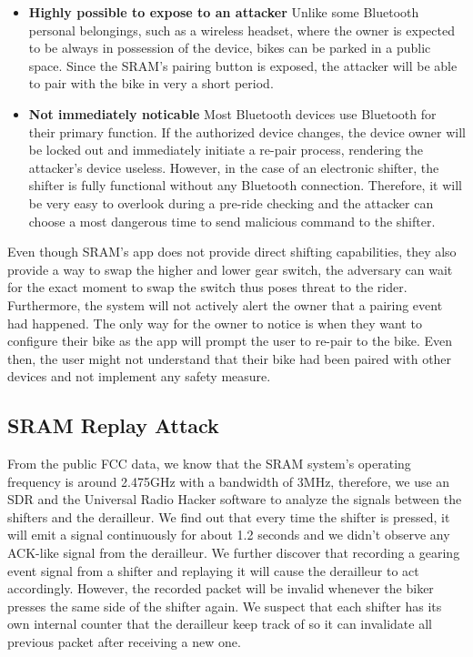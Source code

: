 \documentclass[letterpaper,twocolumn,10pt]{article}
\begin{document}
\begin{itemize}
  \item \textbf{Highly possible to expose to an attacker} Unlike some Bluetooth personal belongings, such as a wireless headset, where the owner is expected to be always in possession of the device, bikes can be parked in a public space. Since the SRAM's pairing button is exposed, the attacker will be able to pair with the bike in very a short period.
  \item \textbf{Not immediately noticable} Most Bluetooth devices use Bluetooth for their primary function. If the authorized device changes, the device owner will be locked out and immediately initiate a re-pair process, rendering the attacker’s device useless. However, in the case of an electronic shifter, the shifter is fully functional without any Bluetooth connection. Therefore, it will be very easy to overlook during a pre-ride checking and the attacker can choose a most dangerous time to send malicious command to the shifter.
\end{itemize}

Even though SRAM's app does not provide direct shifting capabilities, they also provide a way to swap the higher and lower gear switch, the adversary can wait for the exact moment to swap the switch thus poses threat to the rider. Furthermore, the system will not actively alert the owner that a pairing event had happened. The only way for the owner to notice is when they want to configure their bike as the app will prompt the user to re-pair to the bike. Even then, the user might not understand that their bike had been paired with other devices and not implement any safety measure.

\subsection{SRAM Replay Attack}
From the public FCC data, we know that the SRAM system's operating frequency is around 2.475GHz with a bandwidth of 3MHz, therefore, we use an SDR and the Universal Radio Hacker software\cite{urh}  to analyze the signals between the shifters and the derailleur. We find out that every time the shifter is pressed, it will emit a signal continuously for about 1.2 seconds and we didn't observe any ACK-like signal from the derailleur. We further discover that recording a gearing event signal from a shifter and replaying it will cause the derailleur to act accordingly. However, the recorded packet will be invalid whenever the biker presses the same side of the shifter again. We suspect that each shifter has its own internal counter that the derailleur keep track of so it can invalidate all previous packet after receiving a new one.
\end{document}
